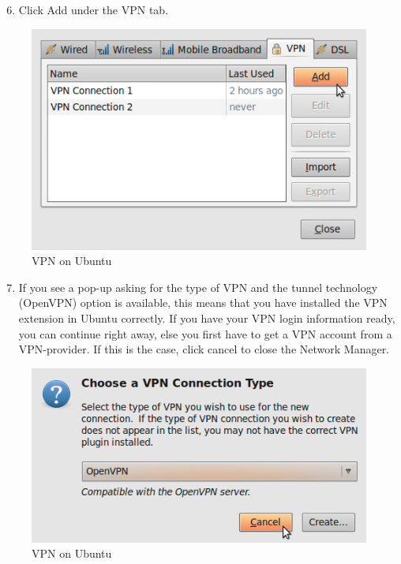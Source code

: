\begin{enumerate}[1.]
\setcounter{enumi}{5}
\item
  Click Add under the VPN tab.
\end{enumerate}
\begin{figure}[htbp]
\centering
\includegraphics{vpn_ubuntu_006.png}
\caption{VPN on Ubuntu}
\end{figure}

\begin{enumerate}[1.]
\setcounter{enumi}{6}
\item
  If you see a pop-up asking for the type of VPN and the tunnel
  technology (OpenVPN) option is available, this means that you have
  installed the VPN extension in Ubuntu correctly. If you have your VPN
  login information ready, you can continue right away, else you first
  have to get a VPN account from a VPN-provider. If this is the case,
  click cancel to close the Network Manager.
\end{enumerate}
\begin{figure}[htbp]
\centering
\includegraphics{vpn_ubuntu_007.png}
\caption{VPN on Ubuntu}
\end{figure}

